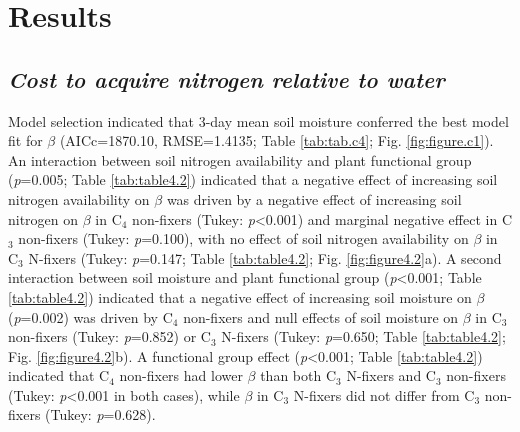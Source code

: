 \newpage
\section{Results}
\subsection{\textit{Cost to acquire nitrogen relative to water}}
\noindent Model selection indicated that 3-day mean soil moisture conferred the best model fit for $\beta$ (AICc=1870.10, RMSE=1.4135; Table \ref{tab:tab.c4}; Fig. \ref{fig:figure.c1}). An interaction between soil nitrogen availability and plant functional group (\textit{p}=0.005; Table \ref{tab:table4.2}) indicated that a negative effect of increasing soil nitrogen availability on $\beta$ was driven by a negative effect of increasing soil nitrogen on $\beta$ in C$_4$ non-fixers (Tukey: \textit{p}<0.001) and marginal negative effect in C$_3$ non-fixers (Tukey: \textit{p}=0.100), with no effect of soil nitrogen availability on $\beta$ in C$_3$ N-fixers (Tukey: \textit{p}=0.147; Table \ref{tab:table4.2}; Fig. \ref{fig:figure4.2}a). A second interaction between soil moisture and plant functional group (\textit{p}<0.001; Table \ref{tab:table4.2}) indicated that a negative effect of increasing soil moisture on $\beta$ (\textit{p}=0.002) was driven by C$_4$ non-fixers and null effects of soil moisture on $\beta$ in C$_3$ non-fixers (Tukey: \textit{p}=0.852) or C$_3$ N-fixers (Tukey: \textit{p}=0.650; Table \ref{tab:table4.2}; Fig. \ref{fig:figure4.2}b). A functional group effect (\textit{p}<0.001; Table \ref{tab:table4.2}) indicated that C$_4$ non-fixers had lower $\beta$ than both C$_3$ N-fixers and C$_3$ non-fixers (Tukey: \textit{p}<0.001 in both cases), while $\beta$ in C$_3$ N-fixers did not differ from C$_3$ non-fixers (Tukey: \textit{p}=0.628).

